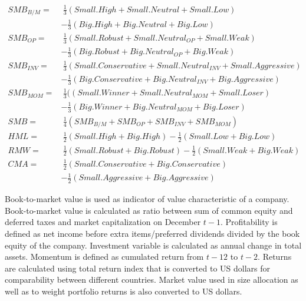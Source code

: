 \documentclass{article}
\begin{document}
\begin{equation} \label{eq:FF6factors}
\begin{split}
SMB_{B/M} = & \ \frac{1}{3} (Small.High + Small.Neutral + Small.Low) \\
			& - \frac{1}{3} (Big.High + Big.Neutral + Big.Low) \\[5pt]
SMB_{OP} = & \ \frac{1}{3} (Small.Robust + Small.Neutral_{OP} + Small.Weak)\\
			& - \frac{1}{3} (Big.Robust + Big.Neutral_{OP} + Big.Weak)\\[5pt]
SMB_{INV} = & \ \frac{1}{3} (Small.Conservative + Small.Neutral_{INV} + Small.Aggressive)\\
			& - \frac{1}{3} (Big.Conservative + Big.Neutral_{INV} + Big.Aggressive)\\[5pt]
SMB_{MOM} = & \ \frac{1}{3} ((Small.Winner + Small.Neutral_{MOM} + Small.Loser)\\
		     	& - \frac{1}{3} (Big.Winner + Big.Neutral_{MOM} + Big.Loser)\\[5pt]
SMB = & \ \frac{1}{4} (SMB_{B/M} + SMB_{OP} + SMB_{INV} + SMB_{MOM})\\[20pt]
HML = & \ \frac{1}{2} (Small.High + Big.High) - \frac{1}{2} (Small.Low + Big.Low)\\[5pt]
RMW = & \ \frac{1}{2} (Small.Robust + Big.Robust) - \frac{1}{2} (Small.Weak + Big.Weak)\\[5pt]
CMA = & \ \frac{1}{2} (Small.Conservative + Big.Conservative)\\
		& - \frac{1}{2} (Small.Aggressive + Big.Aggressive)
\end{split}
\end{equation}

Book-to-market value is used as indicator of value characteristic of a company. Book-to-market value is calculated as ratio between sum of common equity and deferred taxes and market capitalization on December $t-1$. Profitability is defined as net income before extra items/preferred dividends divided by the book equity of the company. Investment variable is calculated as annual change in total assets. Momentum is defined as cumulated return from $t-12$ to $t-2$. Returns are calculated using total return index that is converted to US dollars for comparability between different countries. Market value used in size allocation as well as to weight portfolio returns is also converted to US dollars. 
\end{document}
